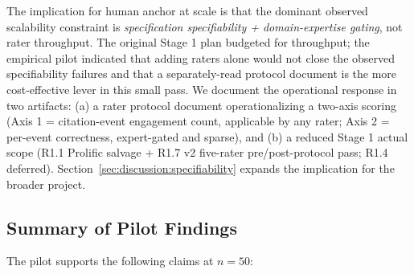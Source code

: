 The implication for human anchor at scale is that the dominant observed scalability constraint is \emph{specification specifiability + domain-expertise gating}, not rater throughput. The original Stage 1 plan budgeted for throughput; the empirical pilot indicated that adding raters alone would not close the observed specifiability failures and that a separately-read protocol document is the more cost-effective lever in this small pass. We document the operational response in two artifacts: (a) a rater protocol document operationalizing a two-axis scoring (Axis 1 = citation-event engagement count, applicable by any rater; Axis 2 = per-event correctness, expert-gated and sparse), and (b) a reduced Stage 1 actual scope (R1.1 Prolific salvage + R1.7 v2 five-rater pre/post-protocol pass; R1.4 deferred). Section~\ref{sec:discussion:specifiability} expands the implication for the broader project.


\subsection{Summary of Pilot Findings}
\label{sec:results:summary}

The pilot supports the following claims at $n = 50$:

